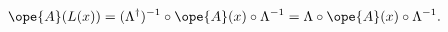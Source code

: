 \begin{equation}	\label{3.4}
\ope{A}(L(x))
= (\Lambda^\dag)^{-1} \circ \ope{A}(x) \circ \Lambda^{-1}
= \Lambda \circ \ope{A}(x) \circ \Lambda^{-1}.
	\end{equation}


